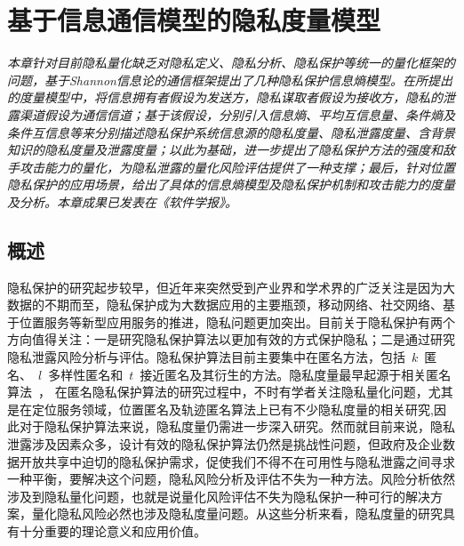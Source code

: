 \chapter{基于信息通信模型的隐私度量模型}
\label{chap:entropy-metric-model}

\textit{ }

\textit{本章针对目前隐私量化缺乏对隐私定义、隐私分析、隐私保护等统一的量化框架的问题，基于Shannon信息论的通信框架提出了几种隐私保护信息熵模型。在所提出的度量模型中，将信息拥有者假设为发送方，隐私谋取者假设为接收方，隐私的泄露渠道假设为通信信道；基于该假设，分别引入信息熵、平均互信息量、条件熵及条件互信息等来分别描述隐私保护系统信息源的隐私度量、隐私泄露度量、含背景知识的隐私度量及泄露度量；以此为基础，进一步提出了隐私保护方法的强度和敌手攻击能力的量化，为隐私泄露的量化风险评估提供了一种支撑；最后，针对位置隐私保护的应用场景，给出了具体的信息熵模型及隐私保护机制和攻击能力的度量及分析。本章成果已发表在《软件学报》。}

\section{概述}

隐私保护的研究起步较早，但近年来突然受到产业界和学术界的广泛关注是因为大数据的不期而至，隐私保护成为大数据应用的主要瓶颈，移动网络、社交网络、基于位置服务等新型应用服务的推进，隐私问题更加突出。目前关于隐私保护有两个方向值得关注：一是研究隐私保护算法以更加有效的方式保护隐私；二是通过研究隐私泄露风险分析与评估。隐私保护算法目前主要集中在匿名方法，包括~$k$~匿名、~$l$~多样性匿名和~$t$~接近匿名及其衍生的方法。隐私度量最早起源于相关匿名算法~\cite{sweeney2002k}， 在匿名隐私保护算法的研究过程中，不时有学者关注隐私量化问题，尤其是在定位服务领域，位置匿名及轨迹匿名算法上已有不少隐私度量的相关研究\cite{shokri2011quantifying,olteanu2017quantifying},因此对于隐私保护算法来说，隐私度量仍需进一步深入研究。然而就目前来说，隐私泄露涉及因素众多，设计有效的隐私保护算法仍然是挑战性问题，但政府及企业数据开放共享中迫切的隐私保护需求，促使我们不得不在可用性与隐私泄露之间寻求一种平衡，要解决这个问题，隐私风险分析及评估不失为一种方法。风险分析依然涉及到隐私量化问题，也就是说量化风险评估不失为隐私保护一种可行的解决方案，量化隐私风险必然也涉及隐私度量问题。从这些分析来看，隐私度量的研究具有十分重要的理论意义和应用价值。

